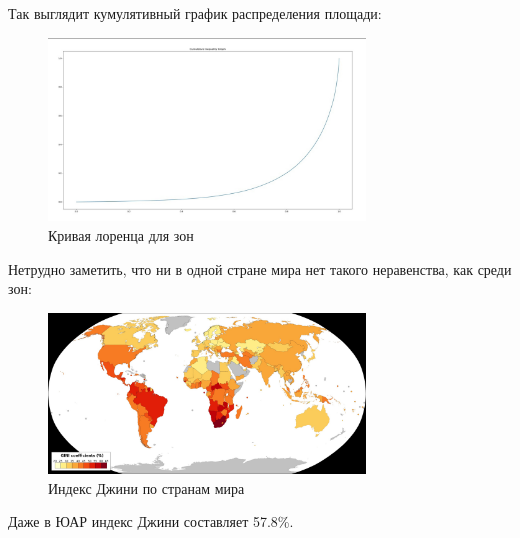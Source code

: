 \documentclass[11pt]{article}
\begin{document}
    Так выглядит кумулятивный график распределения площади:
    \begin{figure}[h!]\label{fig:cumulative_inequality_graph}
        \centering
        \includegraphics[width=0.75\textwidth]{cumulative_inequality_graph.jpg}
        \caption{Кривая лоренца для зон}
    \end{figure}

    Нетрудно заметить, что ни в одной стране мира нет такого неравенства, как среди зон:

    \begin{figure}[h!]\label{fig:gini_index_world}
        \centering
        \includegraphics[width=0.75\textwidth]{gini_index_world.jpg}
        \caption{Индекс Джини по странам мира}
    \end{figure}
    Даже в ЮАР индекс Джини составляет 57.8\%.
\end{document}
